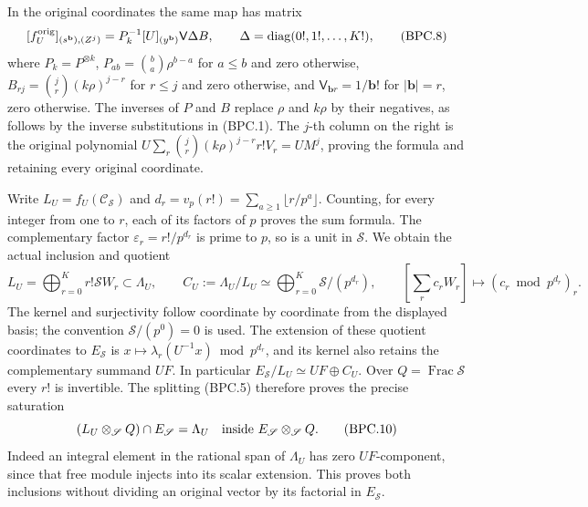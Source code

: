 In the original coordinates the same map has matrix
\[
 [f_U^{\rm orig}]_{(s^{\mathbf b}),(Z^j)}
   =P_k^{-1}[U]_{(y^{\mathbf b})}\mathsf V\Delta B,
 \qquad\Delta=\operatorname{diag}(0!,1!,\ldots,K!),
\tag{BPC.8}\label{eq:bpc8}
\]
where \(P_k=P^{\otimes k}\),
\(P_{ab}=\binom ba\rho^{b-a}\) for \(a\leq b\) and zero
otherwise, \(B_{rj}=\binom jr(k\rho)^{j-r}\) for \(r\leq j\)
and zero otherwise, and
\(\mathsf V_{\mathbf b r}=1/\mathbf b!\) for
\(|\mathbf b|=r\), zero otherwise.  The inverses of \(P\)
and \(B\) replace \(\rho\) and \(k\rho\) by their negatives,
as follows by the inverse substitutions in (BPC.1).
The \(j\)-th column on the right is the original polynomial
\(U\sum_r\binom jr(k\rho)^{j-r}r!V_r=UM^j\), proving
the formula and retaining every original coordinate.

Write \(L_U=f_U(\mathcal C_{\mathscr S})\) and
\(d_r=v_p(r!)=\sum_{a\geq1}\lfloor r/p^a\rfloor\).
Counting, for every integer from one to \(r\), each of its
factors of \(p\) proves the sum formula.  The complementary
factor \(\varepsilon_r=r!/p^{d_r}\) is prime to \(p\), so is
a unit in \(\mathscr S\).  We obtain the actual inclusion and quotient
\[
 L_U=\bigoplus_{r=0}^K r!\mathscr S W_r\subset\Lambda_U,
 \qquad
 C_U:=\Lambda_U/L_U\simeq\bigoplus_{r=0}^K \mathscr S/(p^{d_r}),
 \qquad
 [\sum_r c_rW_r]\longmapsto(c_r\bmod p^{d_r})_r.
\tag{BPC.9}\label{eq:bpc9}
\]
The kernel and surjectivity follow coordinate by coordinate from
the displayed basis; the convention \(\mathscr S/(p^0)=0\) is used.
The extension of these quotient coordinates to \(E_{\mathscr S}\) is
\(x\mapsto\lambda_r(U^{-1}x)\bmod p^{d_r}\), and its kernel
also retains the complementary summand \(UF\).  In particular
\(E_{\mathscr S}/L_U\simeq UF\oplus C_U\).
Over \(Q=\operatorname{Frac}\mathscr S\) every \(r!\) is invertible.
The splitting (BPC.5) therefore proves the precise saturation
\[
 (L_U\otimes_{\mathscr S}Q)\cap E_{\mathscr S}=\Lambda_U
        \quad\hbox{inside }E_{\mathscr S}\otimes_{\mathscr S}Q.
\tag{BPC.10}\label{eq:bpc10}
\]
Indeed an integral element in the rational span of \(\Lambda_U\)
has zero \(UF\)-component, since that free module injects into
its scalar extension.  This proves both inclusions without
dividing an original vector by its factorial in \(E_{\mathscr S}\).

